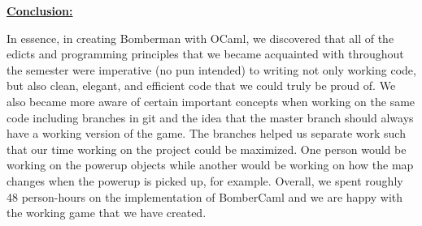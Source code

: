 \documentclass[12pt]{article}
\begin{document}
\vspace{\baselineskip}
\textbf{\uline{Conclusion:}}\par

In essence, in creating Bomberman with OCaml, we discovered that all of the edicts and programming principles that we became acquainted with throughout the semester were imperative (no pun intended) to writing not only working code, but also clean, elegant, and efficient code that we could truly be proud of. We also became more aware of certain important concepts when working on the same code including branches in git and the idea that the master branch should always have a working version of the game. The branches helped us separate work such that our time working on the project could be maximized. One person would be working on the powerup objects while another would be working on how the map changes when the powerup is picked up, for example. Overall, we spent roughly 48 person-hours on the implementation of BomberCaml and we are happy with the working game that we have created.\par


\printbibliography
\end{document}
